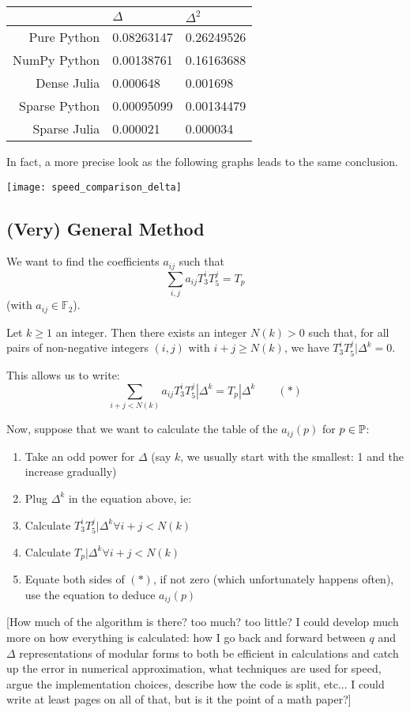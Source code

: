 \begin{center}
	\begin{tabular}{r||l|l}
		 & $\Delta$ & $\Delta^2$\\
		\hline\hline
		Pure Python   & 0.08263147 & 0.26249526 \\
		NumPy Python  & 0.00138761 & 0.16163688 \\
		Dense Julia   & 0.000648   & 0.001698   \\
		Sparse Python & 0.00095099 & 0.00134479 \\
		Sparse Julia  & 0.000021   & 0.000034   \\
	\end{tabular}
\end{center}

In fact, a more precise look as the following graphs leads to the same conclusion.

\texttt{[image: speed\_comparison\_delta]}







\subsection{(Very) General Method}

We want to find the coefficients $a_{ij}$ such that $$\sum_{i, j} a_{ij} T_3^iT_5^j = T_p$$
(with $a_{ij} \in \mathbb{F}_2$).

Let $k\geq 1$ an integer.
Then there exists an integer $N(k)>0$ such that,
for all pairs of non-negative integers $(i, j)$ with $i+j \geq N(k)$,
we have $T_3^{i}T_5^{j}|\Delta^k = 0$.

This allows us to write:
$$\sum_{i+j < N(k)} a_{ij} T_3^iT_5^j|\Delta^k= T_p|\Delta^k \qquad (*)$$

Now, suppose that we want to calculate the table of the $a_{ij}(p)$ for $p \in \mathbb{P}$:
\begin{enumerate}
    \item Take an odd power for $\Delta$ (say $k$, we usually start with the smallest: 1 and the increase gradually)
    \item Plug $\Delta^k$ in the equation above, ie:
    \item Calculate $T_3^iT_5^j|\Delta^k \forall i+j < N(k)$
    \item Calculate $T_p|\Delta^k \forall i+j < N(k)$
    \item Equate both sides of $(*)$, if not zero (which unfortunately happens often), use the equation to deduce $a_{ij}(p)$
\end{enumerate}

[How much of the algorithm is there? too much? too little? I could develop much more on how everything is calculated: how I go back and forward between $q$ and $\Delta$ representations of modular forms to both be efficient in calculations and catch up the error in numerical approximation, what techniques are used for speed, argue the implementation choices, describe how the code is split, etc... I could write at least  pages on all of that, but is it the point of a math paper?]
